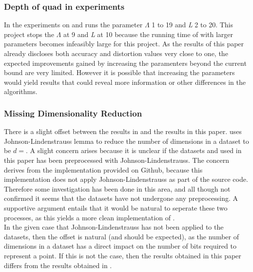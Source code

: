 \subsubsection{Depth of quad in experiments}
\label{disc/threats/depth}
In \cite{wagner17} the experiments on \qs{} and \grid{} runs the parameter $\Lambda$ 1 to 19 and \textit{L} 2 to 20. This project stops the $\Lambda$ at 9 and \textit{L} at 10 because the running time of \qs{} with larger parameters becomes infeasibly large for this project. As the results of this paper already discloses both accuracy and distortion values very close to one, the expected improvements gained by increasing the paramenters beyond the current bound are very limited. However it is possible that increasing the parameters would yield results that could reveal more information or other differences in the algorithms.

\subsubsection{Missing Dimensionality Reduction}
There is a slight offset between the results in \cite{wagner17} and the results in this paper. \cite{wagner17} uses Johnson-Lindenstrauss lemma to reduce the number of dimensions in a dataset to be $d=$. A slight concern arises because it is unclear if the datasets \mnist{} and \sift{} used in this paper has been preprocessed with Johnson-Lindenstrauss. The concern derives from the \qs{} implementation provided on Github, because this implementation does not apply Johnson-Lindenstrauss as part of the source code. Therefore some investigation has been done in this area, and all though not confirmed it seems that the datasets have not undergone any preprocessing. A supportive argument entails that it would be natural to seperate these two processes, as this yields a more clean implementation of \qs{}. 
\\
In the given case that Johnson-Lindenstrauss has not been applied to the datasets, then the offset is natural (and should be expected), as the number of dimensions in a dataset has a direct impact on the number of bits required to represent a point. If this is not the case, then the results obtained in this paper differs from the results obtained in \cite{wagner17}.